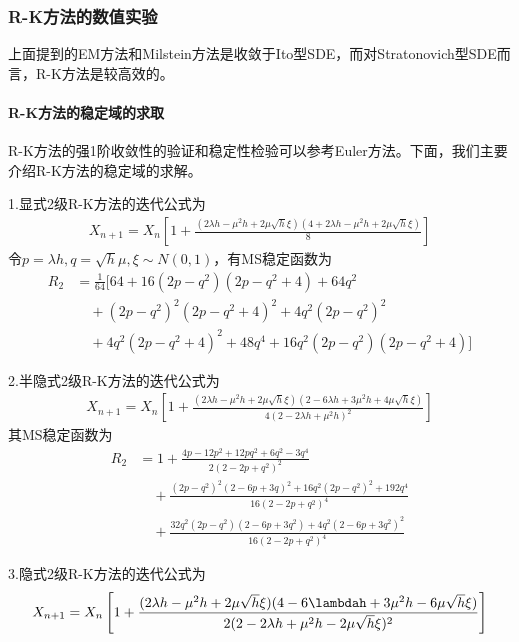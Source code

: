         \subsubsection{R-K方法的数值实验}
            \label{subsubsec:R-K方法的数值实验}
            上面提到的EM方法和Milstein方法是收敛于Ito型SDE，而对Stratonovich型SDE而言，R-K方法是较高效的。
            \paragraph{R-K方法的稳定域的求取}R-K方法的强1阶收敛性的验证和稳定性检验可以参考Euler方法。下面，我们主要介绍R-K方法的稳定域的求解。
            \par
            1.显式2级R-K方法的迭代公式为
            \begin{align*}
            X_{n+1} = X_n \left[ 1+\frac{(2\lambda h- \mu ^2h + 2\mu \sqrt{h}\xi)(4+2\lambda h-\mu ^2h+2\mu\sqrt{h}\xi)}{8}  \right]
            \end{align*}
            令$p = \lambda h,q = \sqrt{h}\mu,\xi \sim N(0,1)$，有MS稳定函数为
            \begin{align*}
            R_2 &= \frac{1}{64}[64+16(2p-q^2)(2p-q^2+4)+64q^2\\
            &\quad+(2p-q^2)^2(2p-q^2+4)^2+4q^2(2p-q^2)^2\\
            &\quad+4q^2(2p-q^2+4)^2+48q^4+16q^2(2p-q^2)(2p-q^2+4)]
            \end{align*}
            \par
            2.半隐式2级R-K方法的迭代公式为
            \begin{align*}
            X_{n+1} = X_n\left[  1+ \frac{(2\lambda h - \mu^2h+2\mu\sqrt{h}\xi)(2-6\lambda h +3\mu^2 h+4\mu\sqrt{h}\xi)}{4(2-2\lambda h +\mu^2h)^2}\right]
            \end{align*}
            其MS稳定函数为
            \begin{align*}
            R_2 &= 1+\frac{4p-12p^2+12pq^2+6q^2-3q^4}{2(2-2p+q^2)^2}\\
            &\quad + \frac{(2p-q^2)^2(2-6p+3q)^2+16q^2(2p-q^2)^2+192q^4}{16(2-2p+q^2)^4}\\
            &\quad +\frac{32q^2(2p-q^2)(2-6p+3q^2)+4q^2(2-6p+3q^2)^2}{16(2-2p+q^2)^4}
            \end{align*}
            \par
            3.隐式2级R-K方法的迭代公式为
            \begin{align*}
            X_{n+1} = X_n\left[ 1+\frac{(2\lambda h-\mu^2h+2\mu\sqrt{h}\xi)(4-6\lambdah+3\mu^2h-6\mu\sqrt{h}\xi)}{2(2-2\lambda h+\mu^2h-2\mu\sqrt{h}\xi)^2} \right]
            \end{align*}

